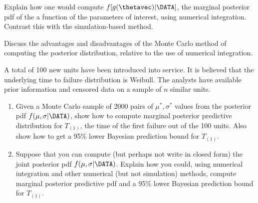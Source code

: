 \begin{exercise}
Explain how one would compute $f[g(\thetavec) | \DATA]$,
the marginal posterior pdf of the
a function of the parameters of interest,
using numerical integration. Contrast this with the simulation-based method.
\end{exercise}

\begin{exercise}
Discuss the advantages and disadvantages of the Monte Carlo method of
computing
the posterior distribution, relative to the use of numerical integration.
\end{exercise}

\begin{exercise}
A total of 100 new units have been introduced into service.  It is
believed that the underlying time to failure distribution is Weibull.
The analysts have available prior information and censored data on a
sample of $n$ similar units.
\begin{enumerate}
\item
Given a Monte Carlo sample of 2000 pairs of $\mu^{*},\sigma^{*}$
values from the posterior pdf $f(\mu,\sigma | \DATA)$, show how to
compute marginal posterior predictive distribution for $T_{(1)}$,
the time of the first failure out of the 100 units. Also show how to
get a 95\% lower Bayesian prediction bound for $T_{(1)}$.
\item
Suppose that you can compute (but perhaps not write in closed form)
the joint posterior pdf $f(\mu,\sigma |\DATA)$. Explain how
you could, using numerical integration and other numerical (but not
simulation) methods, compute marginal posterior predictive
pdf  and a 95\% lower Bayesian prediction bound for $T_{(1)}$.
\end{enumerate}
\end{exercise}

